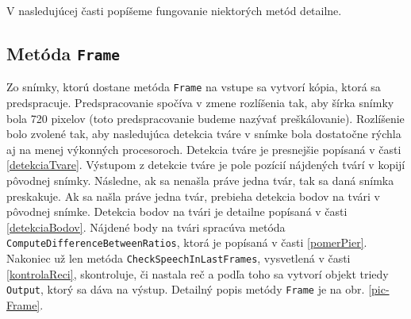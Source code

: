 V nasledujúcej časti popíšeme fungovanie niektorých metód detailne.

\subsection{Metóda \texttt{Frame}}
Zo snímky, ktorú dostane metóda \texttt{Frame} na vstupe sa vytvorí kópia, ktorá sa predspracuje.
Predspracovanie spočíva v zmene rozlíšenia tak, aby šírka snímky bola  720 pixelov (toto predspracovanie budeme nazývať preškálovanie).
Rozlíšenie bolo zvolené tak, aby nasledujúca detekcia tváre v snímke bola dostatočne rýchla aj na menej výkonných procesoroch.
Detekcia tváre je presnejšie popísaná v časti \ref{detekciaTvare}.
Výstupom z detekcie tváre je pole pozícií nájdených tvárí v kopijí pôvodnej snímky. 
Následne, ak sa nenašla práve jedna tvár, tak sa daná snímka preskakuje. 
Ak sa našla práve jedna tvár, prebieha detekcia bodov na tvári v pôvodnej snímke. 
Detekcia bodov na tvári je detailne popísaná v časti \ref{detekciaBodov}.
Nájdené body na tvári spracúva metóda \texttt{ComputeDifferenceBetweenRatios}, ktorá je popísaná v časti \ref{pomerPier}.
Nakoniec už len metóda \texttt{CheckSpeechInLastFrames}, vysvetlená v časti  \ref{kontrolaReci}, skontroluje, či nastala reč a podľa toho sa vytvorí objekt triedy \texttt{Output}, ktorý sa dáva na výstup. 
Detailný popis metódy \texttt{Frame} je na obr. \ref{pic-Frame}.

